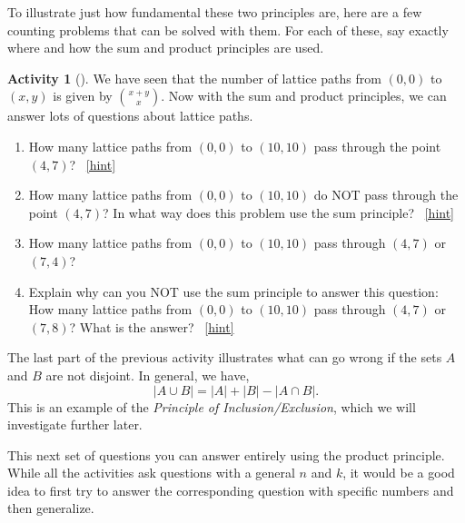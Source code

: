 \documentclass[10pt,]{book}
\theoremstyle{plain}
\theoremstyle{definition}
\theoremstyle{definition}
\theoremstyle{definition}
\newtheorem{activity}[project]{Activity}
\numberwithin{equation}{chapter}
\newcommand{\card}[1]{\left| #1 \right|}
\begin{document}
\hypertarget{p-180}{}%
To illustrate just how fundamental these two principles are, here are a few counting problems that can be solved with them.  For each of these, say exactly where and how the sum and product principles are used.%
\begin{activity}[]\label{act-latticepaths2}
\hypertarget{p-181}{}%
We have seen that the number of lattice paths from \((0,0)\) to \((x,y)\) is given by \(\binom{x+y}{x}\).  Now with the sum and product principles, we can answer lots of questions about lattice paths.%
\begin{enumerate}[font=\bfseries,label=(\alph*),ref=\alph*]
\item\label{task-58} \hypertarget{p-182}{}%
How many lattice paths from \((0,0)\) to \((10,10)\) pass through the point \((4,7)\)?%
~\hfill{\tiny\hyperlink{a-23.a}{[hint]}\hypertarget{q-23.a}{}}\item\label{task-59} \hypertarget{p-184}{}%
How many lattice paths from \((0,0)\) to \((10,10)\) do NOT pass through the point \((4,7)\)?  In what way does this problem use the sum principle?%
~\hfill{\tiny\hyperlink{a-23.b}{[hint]}\hypertarget{q-23.b}{}}\item\label{task-60} \hypertarget{p-186}{}%
How many lattice paths from \((0,0)\) to \((10,10)\) pass through \((4,7)\) or \((7,4)\)?%
\item\label{task-61} \hypertarget{p-187}{}%
Explain why can you NOT use the sum principle to answer this question: How many lattice paths from \((0,0)\) to \((10,10)\) pass through \((4,7)\) or \((7,8)\)?  What is the answer?%
~\hfill{\tiny\hyperlink{a-23.d}{[hint]}\hypertarget{q-23.d}{}}\end{enumerate}
\end{activity}
\hypertarget{p-189}{}%
The last part of the previous activity illustrates what can go wrong if the sets \(A\) and \(B\) are not disjoint.  In general, we have,%
\begin{equation*}
\card{A \cup B} = \card{A} + \card{B} - \card{A \cap B}.
\end{equation*}
This is an example of the \emph{Principle of Inclusion/Exclusion}, which we will investigate further later.%
\par
\hypertarget{p-190}{}%
This next set of questions you can answer entirely using the product principle.  While all the activities ask questions with a general \(n\) and \(k\), it would be a good idea to first try to answer the corresponding question with specific numbers and then generalize.%
\end{document}
